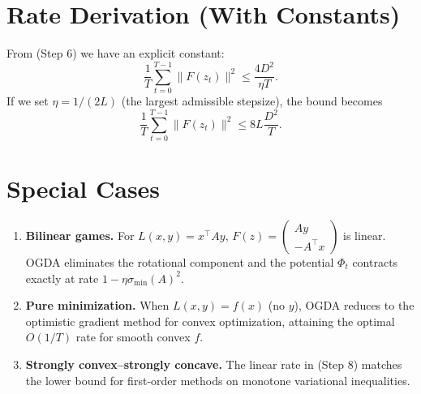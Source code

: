 \documentclass{article}
\begin{document}
\section*{Rate Derivation (With Constants)}
From (Step 6) we have an explicit constant:
\[
\boxed{\frac{1}{T}\sum_{t=0}^{T-1}\|F(z_{t})\|^{2}\le \frac{4D^{2}}{\eta T}}.
\]
If we set $\eta = 1/(2L)$ (the largest admissible stepsize), the bound becomes
\[
\frac{1}{T}\sum_{t=0}^{T-1}\|F(z_{t})\|^{2}\le 8L\frac{D^{2}}{T}.
\]

\section*{Special Cases}
\begin{enumerate}[label=\alph*)]
\item \textbf{Bilinear games.} For $L(x,y)=x^{\top}Ay$, $F(z)=\begin{pmatrix}Ay\\-A^{\top}x\end{pmatrix}$ is linear. OGDA eliminates the rotational component and the potential $\Phi_{t}$ contracts exactly at rate $1-\eta\sigma_{\min}(A)^{2}$.
\item \textbf{Pure minimization.} When $L(x,y)=f(x)$ (no $y$), OGDA reduces to the optimistic gradient method for convex optimization, attaining the optimal $O(1/T)$ rate for smooth convex $f$.
\item \textbf{Strongly convex–strongly concave.} The linear rate in (Step 8) matches the lower bound for first‑order methods on monotone variational inequalities.
\end{enumerate}
\end{document}
